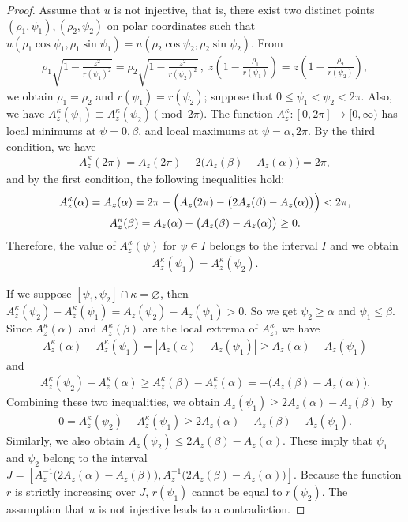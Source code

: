 \documentclass{amsart}
\theoremstyle{plain}
\theoremstyle{definition}
\theoremstyle{remark}
\begin{document}
\begin{proof}%
Assume that $u$ is not injective, that is, there exist two distinct points $(\rho_1,\psi_1),(\rho_2,\psi_2)$ on polar coordinates such that $u(\rho_1\cos\psi_1,\rho_1\sin\psi_1)=u(\rho_2\cos\psi_2,\rho_2\sin\psi_2)$.
From
\begin{align*}
\rho_1\sqrt{1-\frac{z^2}{r(\psi_1)^2}}=\rho_2\sqrt{1-\frac{z^2}{r(\psi_2)^2}}\,,\;
z\left(1-\frac{\rho_1}{r(\psi_1)}\right)=z\left(1-\frac{\rho_2}{r(\psi_2)}\right),
\end{align*}
we obtain $\rho_1=\rho_2$ and $r(\psi_1)=r(\psi_2)$; suppose that $0\le\psi_1<\psi_2<2\pi$.
Also, we have $A_z^{\kappa}(\psi_1)\equiv A_z^{\kappa}(\psi_2)\pmod{2\pi}$.
The function $A_z^{\kappa} \colon [0,2\pi]\to[0,\infty)$ has local minimums at $\psi=0,\beta$, and local maximums at $\psi=\alpha,2\pi$.
By the third condition, we have
\begin{align*}
A_z^{\kappa}(2\pi)=A_z(2\pi)-2\bigl(A_z(\beta)-A_z(\alpha)\bigr)=2\pi,
\end{align*}
and by the first condition, the following inequalities hold:
\begin{gather*}
A_z^{\kappa}(\alpha)=A_z(\alpha)=2\pi-\Bigl(A_z(2\pi)-\bigl(2A_z(\beta)-A_z(\alpha)\bigr)\Bigr)<2\pi,\\
A_z^{\kappa}(\beta)=A_z(\alpha)-\bigl(A_z(\beta)-A_z(\alpha)\bigr)\ge0.
\end{gather*}
Therefore, the value of $A_z^{\kappa}(\psi)$ for $\psi\in I$ belongs to the interval $I$ and we obtain
\begin{align*}
A_z^{\kappa}(\psi_1)=A_z^{\kappa}(\psi_2).
\end{align*}

If we suppose $[\psi_1,\psi_2]\cap\kappa=\varnothing$, then $A_z^{\kappa}(\psi_2)-A_z^{\kappa}(\psi_1)=A_z(\psi_2)-A_z(\psi_1)>0$.
So we get $\psi_2\ge\alpha$ and $\psi_1\le\beta$.
Since $A_z^{\kappa}(\alpha)$ and $A_z^{\kappa}(\beta)$ are the local extrema of $A_z^{\kappa}$, we have
\begin{align*}
A_z^{\kappa}(\alpha)-A_z^{\kappa}(\psi_1)=|A_z(\alpha)-A_z(\psi_1)|\ge A_z(\alpha)-A_z(\psi_1)
\end{align*}
and
\begin{align*}
A_z^{\kappa}(\psi_2)-A_z^{\kappa}(\alpha)\ge A_z^{\kappa}(\beta)-A_z^{\kappa}(\alpha)=-\bigl(A_z(\beta)-A_z(\alpha)\bigr).
\end{align*}
Combining these two inequalities, we obtain $A_z(\psi_1)\ge 2A_z(\alpha)-A_z(\beta)$ by
\begin{align*}
0=A_z^{\kappa}(\psi_2)-A_z^{\kappa}(\psi_1)\ge2A_z(\alpha)-A_z(\beta)-A_z(\psi_1).
\end{align*}
Similarly, we also obtain $A_z(\psi_2)\le2A_z(\beta)-A_z(\alpha)$. These imply that $\psi_1$ and $\psi_2$ belong to the interval $J=[A_z^{-1}\bigl(2A_z(\alpha)-A_z(\beta)\bigr),A_z^{-1}\bigl(2A_z(\beta)-A_z(\alpha)\bigr)]$.
Because the function $r$ is strictly increasing over $J$, $r(\psi_1)$ cannot be equal to $r(\psi_2)$.
The assumption that $u$ is not injective leads to a contradiction. 
\end{proof}
\end{document}
